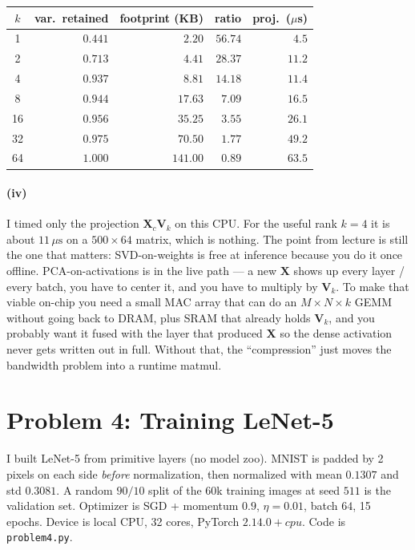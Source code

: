 \documentclass[11pt]{article}
\newcommand{\mat}[1]{\mathbf{#1}}
\begin{document}
\begin{center}
\begin{tabular}{crrrr}
    \toprule
    \(k\) & var.\ retained & footprint (KB) & ratio & proj.\ (\(\mu\)s) \\
    \midrule
    1  & \(0.441\) & \(2.20\)  & \(56.74\) & \(4.5\) \\
    2  & \(0.713\) & \(4.41\)  & \(28.37\) & \(11.2\) \\
    4  & \(0.937\) & \(8.81\)  & \(14.18\) & \(11.4\) \\
    8  & \(0.944\) & \(17.63\) & \(7.09\)  & \(16.5\) \\
    16 & \(0.956\) & \(35.25\) & \(3.55\)  & \(26.1\) \\
    32 & \(0.975\) & \(70.50\) & \(1.77\)  & \(49.2\) \\
    64 & \(1.000\) & \(141.00\)& \(0.89\)  & \(63.5\) \\
    \bottomrule
\end{tabular}
\end{center}

\paragraph{(iv)}
I timed only the projection \(\mat{X}_c\mat{V}_k\) on this CPU. For the
useful rank \(k=4\) it is about \(11\,\mu\mathrm{s}\) on a \(500\times 64\)
matrix, which is nothing. The point from lecture is still the one that
matters: SVD-on-weights is free at inference because you do it once
offline. PCA-on-activations is in the live path --- a new \(\mat{X}\)
shows up every layer / every batch, you have to center it, and you have
to multiply by \(\mat{V}_k\). To make that viable on-chip you need a
small MAC array that can do an \(M\times N\times k\) GEMM without going
back to DRAM, plus SRAM that already holds \(\mat{V}_k\), and you
probably want it fused with the layer that produced \(\mat{X}\) so the
dense activation never gets written out in full. Without that, the
``compression'' just moves the bandwidth problem into a runtime matmul.

\newpage
\section{Problem 4: Training LeNet-5}

I built LeNet-5 from primitive layers (no model zoo). MNIST is padded by 2
pixels on each side \emph{before} normalization, then normalized with
mean \(0.1307\) and std \(0.3081\). A random \(90/10\) split of the 60k
training images at seed \(511\) is the validation set. Optimizer is SGD
+ momentum \(0.9\), \(\eta=0.01\), batch \(64\), 15 epochs. Device is
local CPU, 32 cores, PyTorch \(2.14.0+cpu\). Code is
\texttt{problem4.py}.
\end{document}
